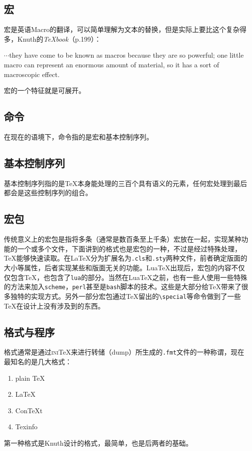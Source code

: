 \documentclass{article}
\newcommand{\TeXbook}{\textit{\TeX book}}
\begin{document}
\subsection{宏}
宏是英语Macro的翻译，可以简单理解为文本的替换，但是实际上要比这个复杂得多，Knuth的\TeXbook（p.199）：
\begin{center}
$\cdots$they have come to be known as macros because they are so powerful; one little macro can represent an enormous amount of material, so it has a sort of macroscopic effect.
\end{center}
宏的一个特征就是可展开。
\subsection{命令}
在现在的语境下，命令指的是宏和基本控制序列。
\subsection{基本控制序列}
基本控制序列指的是\TeX 本身能处理的三百个具有语义的元素，任何宏处理到最后都会是这些控制序列的组合。
\subsection{宏包}
传统意义上的宏包是指将多条（通常是数百条至上千条）宏放在一起，实现某种功能的一个或多个文件，下面讲到的格式也是宏包的一种，不过是经过特殊处理，\TeX 能够快速读取。在\LaTeX 分为扩展名为\verb!.cls!和\verb!.sty!两种文件，前者确定版面的大小等属性，后者实现某些和版面无关的功能。Lua\TeX 出现后，宏包的内容不仅仅包含\TeX，也包含了\verb!lua!的部分。当然在Lua\TeX 之前，也有一些人使用一些特殊的方法来加入\verb!scheme!，\verb!perl!甚至是\verb!bash!脚本的技术。这些是大部分给\TeX 带来了很多独特的实现方式。另外一部分宏包通过\TeX 留出的\verb!\special!等命令做到了一些\TeX 在设计上没有涉及到的东西。
\subsection{格式与程序}
格式通常是通过\textsc{ini}\TeX 来进行转储（dump）所生成的\verb!.fmt!文件的一种称谓，现在最知名的是几大格式：
\begin{enumerate}
\item plain \TeX
\item \LaTeX
\item Con\TeX t
\item Texinfo
\end{enumerate}

第一种格式是Knuth设计的格式，最简单，也是后两者的基础。
\end{document}
